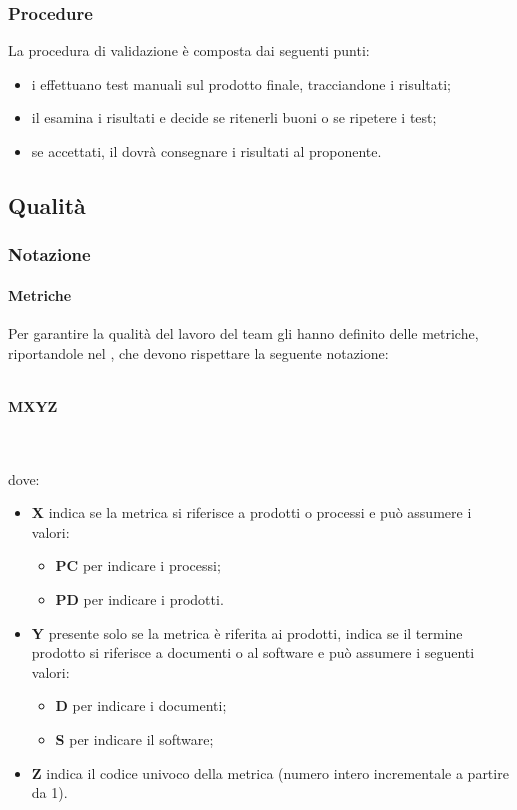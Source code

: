  \subsubsection{Procedure}
 La procedura di validazione è composta dai seguenti punti:
 \begin{itemize}
 	\item i \VERP{} effettuano test manuali sul prodotto finale, tracciandone i risultati;
 	\item il \RESP{} esamina i risultati e decide se ritenerli buoni o se ripetere i test;
 	\item se accettati, il \RESP{} dovrà consegnare i risultati al proponente.
 \end{itemize}
 \newpage

\subsection{Qualità}
\subsubsection{Notazione}
\paragraph{Metriche}
Per garantire la qualità del lavoro del team gli \AMMP{} hanno definito delle metriche, riportandole
nel \PQdoc, che devono rispettare la seguente notazione:\\ \\
\centerline{\textbf{M\textbraceleft{}X\textbraceright{}\textbraceleft{}Y\textbraceright{}\textbraceleft{}Z\textbraceright{}}} \\ \\
dove:
\begin{itemize}
	\item \textbf{X} indica se la metrica si riferisce a prodotti o processi e può assumere
	i valori:
	\begin{itemize}
		\item \textbf{PC} per indicare i processi;
		\item \textbf{PD} per indicare i prodotti.
	\end{itemize}
	\item \textbf{Y} presente solo se la metrica è riferita ai prodotti, indica se il termine prodotto si riferisce a documenti o al software e può assumere i seguenti valori:
	\begin{itemize}
		\item \textbf{D} per indicare i documenti;
		\item \textbf{S} per indicare il software;
	\end{itemize}
	\item \textbf{Z} indica il codice univoco della metrica (numero intero incrementale a partire da 1).
\end{itemize}
